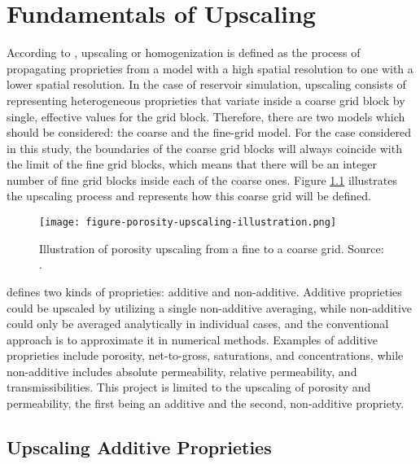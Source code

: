 \chapter{Fundamentals of Upscaling}
\label{chapter-upscaling}

According to \cite{Lie2015}, upscaling or homogenization is defined as the process of propagating proprieties from a model with a high spatial resolution to one with a lower spatial resolution.
%
In the case of reservoir simulation, upscaling consists of representing heterogeneous proprieties that variate inside a coarse grid block by single, effective values for the grid block.
%
Therefore, there are two models which should be considered: the coarse and the fine-grid model.
%
For the case considered in this study, the boundaries of the coarse grid blocks will always coincide with the limit of the fine grid blocks, which means that there will be an integer number of fine grid blocks inside each of the coarse ones.
%
Figure \ref{figure-porosity-upscaling-illustration} illustrates the upscaling process and represents how this coarse grid will be defined.
%
\begin{figure}[h]
	\centering
	\texttt{[image: figure-porosity-upscaling-illustration.png]}
	\caption{Illustration of porosity upscaling from a fine to a coarse grid. Source: \cite{Lie2015}.}
	\label{figure-porosity-upscaling-illustration}
\end{figure}

\cite{Lie2015} defines two kinds of proprieties: additive and non-additive.
%
Additive proprieties could be upscaled by utilizing a single non-additive averaging, while non-additive could only be averaged analytically in individual cases, and the conventional approach is to approximate it in numerical methods.
%
Examples of additive proprieties include porosity, net-to-gross, saturations, and concentrations, while non-additive includes absolute permeability, relative permeability, and transmissibilities.
%
This project is limited to the upscaling of porosity and permeability, the first being an additive and the second, non-additive propriety.

\section{Upscaling Additive Proprieties}

